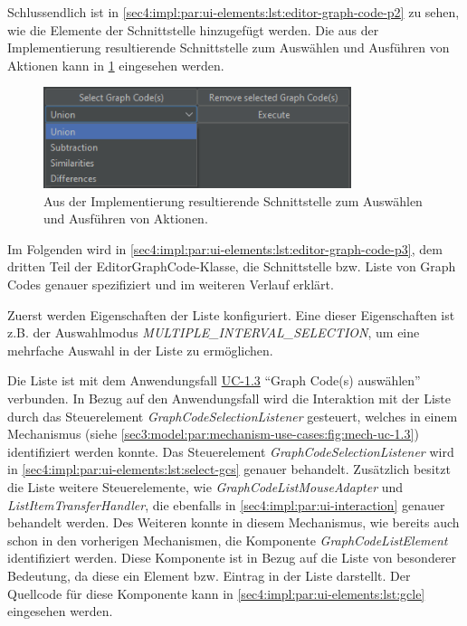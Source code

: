 Schlussendlich ist in \cref{sec4:impl:par:ui-elements:lst:editor-graph-code-p2} zu sehen, wie die Elemente der Schnittstelle hinzugefügt werden.
Die aus der Implementierung resultierende Schnittstelle zum Auswählen und Ausführen von Aktionen kann in \cref{sec4:impl:par:ui-elements:fig:wireframe-ui-4} eingesehen werden.

\begin{figure}[!ht]
  \includegraphics[width=9cm]{chapter/chapter_4/wireframe-impl-ui-4}
  \caption{Aus der Implementierung resultierende Schnittstelle zum Auswählen und Ausführen von Aktionen.}
  \label{sec4:impl:par:ui-elements:fig:wireframe-ui-4}
\end{figure}

Im Folgenden wird in \cref{sec4:impl:par:ui-elements:lst:editor-graph-code-p3}, dem dritten Teil der EditorGraphCode-Klasse, die Schnittstelle  bzw. Liste von Graph Codes genauer spezifiziert und im weiteren Verlauf erklärt.



Zuerst werden Eigenschaften der Liste konfiguriert.
Eine dieser Eigenschaften ist z.B. der Auswahlmodus \textit{MULTIPLE\_INTERVAL\_SELECTION}, um eine mehrfache Auswahl in der Liste zu ermöglichen.

Die Liste ist mit dem Anwendungsfall \hyperref[sec3:model:uc-1.3]{UC-1.3} \enquote{Graph Code(s) auswählen} verbunden.
In Bezug auf den Anwendungsfall wird die Interaktion mit der Liste durch das Steuerelement \textit{GraphCodeSelectionListener} gesteuert, welches in einem Mechanismus (siehe \cref{sec3:model:par:mechanism-use-cases:fig:mech-uc-1.3}) identifiziert werden konnte.
Das Steuerelement \textit{GraphCodeSelectionListener} wird in \cref{sec4:impl:par:ui-elements:lst:select-gcs} genauer behandelt.
Zusätzlich besitzt die Liste weitere Steuerelemente, wie \textit{GraphCodeListMouseAdapter} und \textit{ListItemTransferHandler}, die ebenfalls in \cref{sec4:impl:par:ui-interaction} genauer behandelt werden.
Des Weiteren konnte in diesem Mechanismus, wie bereits auch schon in den vorherigen Mechanismen, die Komponente \textit{GraphCodeListElement} identifiziert werden.
Diese Komponente ist in Bezug auf die Liste von besonderer Bedeutung, da diese ein Element bzw. Eintrag in der Liste darstellt.
Der Quellcode für diese Komponente kann in \cref{sec4:impl:par:ui-elements:lst:gcle} eingesehen werden.

